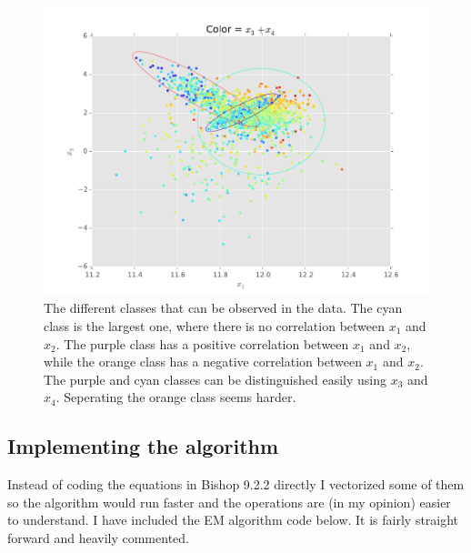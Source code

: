 \documentclass[paper=a4, fontsize=10pt]{scrartcl} %
\numberwithin{equation}{section} %
\numberwithin{figure}{section} %
\numberwithin{table}{section} %
\begin{document}
\begin{figure}[h!]
	\centering
	\includegraphics[width=\textwidth]{exercise_11_annotated.pdf}
	\caption{The different classes that can be observed in the data. The cyan class is the largest one, where there is no correlation between $x_1$ and $x_2$. The purple class has a positive correlation between $x_1$ and $x_2$, while the orange class has a negative correlation between $x_1$ and $x_2$. The purple and cyan classes can be distinguished easily using $x_3$ and $x_4$. Seperating the orange class seems harder.}
	\label{visualization_annotated}
\end{figure}
\subsection{Implementing the algorithm}
Instead of coding the equations in Bishop 9.2.2 directly I vectorized some of them so the algorithm would run faster and the operations are (in my opinion) easier to understand. I have included the EM algorithm code below. It is fairly straight forward and heavily commented.
\end{document}
